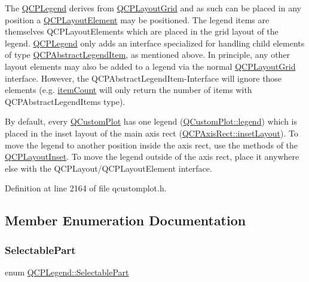 The \hyperlink{class_q_c_p_legend}{Q\+C\+P\+Legend} derives from \hyperlink{class_q_c_p_layout_grid}{Q\+C\+P\+Layout\+Grid} and as such can be placed in any position a \hyperlink{class_q_c_p_layout_element}{Q\+C\+P\+Layout\+Element} may be positioned. The legend items are themselves Q\+C\+P\+Layout\+Elements which are placed in the grid layout of the legend. \hyperlink{class_q_c_p_legend}{Q\+C\+P\+Legend} only adds an interface specialized for handling child elements of type \hyperlink{class_q_c_p_abstract_legend_item}{Q\+C\+P\+Abstract\+Legend\+Item}, as mentioned above. In principle, any other layout elements may also be added to a legend via the normal \hyperlink{class_q_c_p_layout_grid}{Q\+C\+P\+Layout\+Grid} interface. However, the Q\+C\+P\+Abstract\+Legend\+Item-\/\+Interface will ignore those elements (e.\+g. \hyperlink{class_q_c_p_legend_a57ab86ab8b2a3762d4c1455eb5452c88}{item\+Count} will only return the number of items with Q\+C\+P\+Abstract\+Legend\+Items type).

By default, every \hyperlink{class_q_custom_plot}{Q\+Custom\+Plot} has one legend (\hyperlink{class_q_custom_plot_a4eadcd237dc6a09938b68b16877fa6af}{Q\+Custom\+Plot\+::legend}) which is placed in the inset layout of the main axis rect (\hyperlink{class_q_c_p_axis_rect_a949f803466619924c7018df4b511ae10}{Q\+C\+P\+Axis\+Rect\+::inset\+Layout}). To move the legend to another position inside the axis rect, use the methods of the \hyperlink{class_q_c_p_layout_inset}{Q\+C\+P\+Layout\+Inset}. To move the legend outside of the axis rect, place it anywhere else with the Q\+C\+P\+Layout/\+Q\+C\+P\+Layout\+Element interface. 

Definition at line 2164 of file qcustomplot.\+h.



\subsection{Member Enumeration Documentation}
\mbox{\label{class_q_c_p_legend_a5404de8bc1e4a994ca4ae69e2c7072f1}} 
\subsubsection{\texorpdfstring{Selectable\+Part}{SelectablePart}}
{\footnotesize\ttfamily enum \hyperlink{class_q_c_p_legend_a5404de8bc1e4a994ca4ae69e2c7072f1}{Q\+C\+P\+Legend\+::\+Selectable\+Part}}

